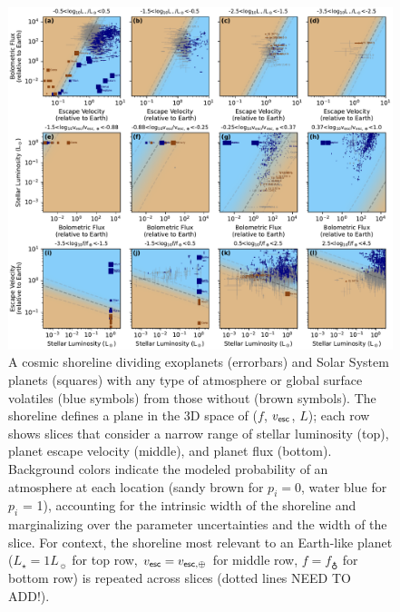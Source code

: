 \documentclass[modern,linenumbers,trackchanges]{aastex7}
\newcommand{\todo}[1]{{\color{orange}  #1 \normalfont}}
\begin{document}
\begin{figure}[ht!]
\includegraphics[width=\textwidth]{figures/grid-of-shorelines-any.pdf}
\caption{A cosmic shoreline dividing exoplanets (errorbars) and Solar System planets (squares) with any type of atmosphere or global surface volatiles (blue symbols) from those without (brown symbols). The shoreline defines a plane in the 3D space of ($f$, $v_{\sf esc}$, $L$); each row shows slices that consider a narrow range of stellar luminosity (top), planet escape velocity (middle), and planet flux (bottom). Background colors indicate the modeled probability of an atmosphere at each location (sandy brown for $p_i = 0$, water blue for $p_i$ = 1), accounting for the intrinsic width of the shoreline and marginalizing over the parameter uncertainties and the width of the slice. For context, the shoreline most relevant to an Earth-like planet ($L_\star = 1L_\sun$ for top row, $v_{\sf esc} = v_{\sf esc, \oplus}$ for middle row, $f = f_\earth$ for bottom row) is repeated across slices (dotted lines \todo{NEED TO ADD!).}}
\label{f:shoreline-any}
\end{figure}
\end{document}
